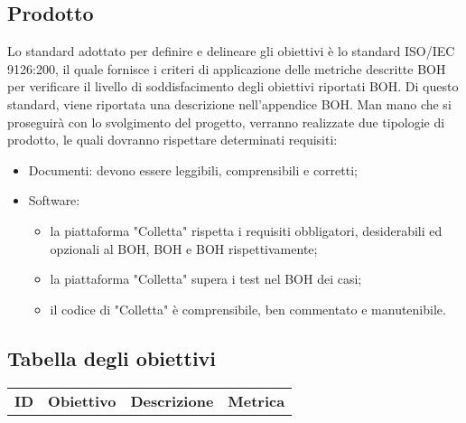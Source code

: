 \subsection{Prodotto}
Lo standard adottato per definire e delineare gli obiettivi è lo standard ISO/IEC 9126:200, il quale fornisce i criteri di applicazione delle metriche descritte BOH per verificare il livello di soddisfacimento degli obiettivi riportati BOH. 
Di questo standard, viene riportata una descrizione nell'appendice BOH.
Man mano che si proseguirà con lo svolgimento del progetto, verranno realizzate due tipologie di prodotto, le quali dovranno rispettare determinati requisiti:
\begin{itemize}
	\item Documenti: devono essere leggibili, comprensibili e corretti;
	\item Software: 
	\begin{itemize}
		\item la piattaforma "Colletta" rispetta i requisiti obbligatori, desiderabili ed opzionali al BOH, BOH e BOH rispettivamente;
		\item la piattaforma "Colletta" supera i test nel BOH dei casi;
		\item il codice di "Colletta" è comprensibile, ben commentato e manutenibile.
	\end{itemize}
\end{itemize}

\subsection{Tabella degli obiettivi}

\begin{longtable}{| c | p{5cm} | p{5cm} | c |}
	\rowcolor{LightBlue}
	\color{white}\bfseries ID & \color{white}\bfseries Obiettivo & \color{white}\bfseries Descrizione & \color{white}\bfseries Metrica \\[0.25cm]
	
\end{longtable}